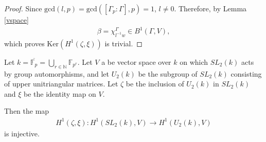 \begin{proof}
Since $\mathrm{gcd}(l, p) = \mathrm{gcd}\left([\Gamma_p:\Gamma], p\right) = 1$, $l \neq 0$. Therefore, by Lemma \ref{vspace}
\begin{align*}
	\beta = \chi^\Gamma_{l^{-1}w} \in B^1(\Gamma, V),
\end{align*}
which proves $\mathrm{Ker}\left(H^1(\zeta, \xi)\right)$ is trivial.
\end{proof}

\begin{example}
	Let $k = \overline{\mathbb{F}_p} = \bigcup_{r\in \mathbb{N}} \mathbb{F}_{p^r}$.
Let $V$ a be vector space over $k$ on which $SL_2(k)$ acts by group automorphisms, and let $U_2(k)$ be the subgroup of $SL_2(k)$ consisting of upper unitriangular matrices. Let $\zeta$ be the inclusion of $U_2(k)$ in $SL_2(k)$ and $\xi$ be the identity map on $V$.

Then the map
	\begin{align}
		H^1(\zeta, \xi): H^1(SL_2(k), V) \rightarrow H^1(U_2(k), V)
	\end{align}
	is injective.
\label{eg:sl2ab}
\end{example}
